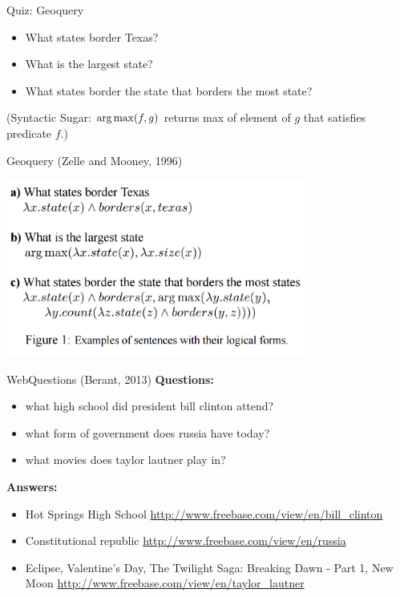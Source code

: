 \documentclass{beamer}
\begin{document}
\begin{frame}{Quiz: Geoquery}
  \begin{itemize}
  \item What states border Texas?
    \air 
  \item What is the largest state?
    \air 
  \item What states border the state that borders  the most state?
  \end{itemize}

  (Syntactic Sugar: $\argmax(f, g)$ returns max of element of $g$ that satisfies 
    predicate $f$.)
\end{frame}




\begin{frame}{Geoquery (Zelle and Mooney, 1996)}
  \begin{center}
    \includegraphics[width=10cm]{geoquery}
  \end{center}
\end{frame}

\begin{frame}[fragile]{WebQuestions (Berant, 2013)} 
\textbf{Questions:}
\begin{itemize}
\item what high school did president bill clinton attend?
\item what form of government does russia have today?
\item what movies does taylor lautner play in?
\end{itemize}
\textbf{Answers:}
\begin{itemize}
\item Hot Springs High School \url{http://www.freebase.com/view/en/bill_clinton}
\item Constitutional republic \url{http://www.freebase.com/view/en/russia}
\item  Eclipse, Valentine's Day, The Twilight Saga: Breaking Dawn -   Part 1, New Moon \url{http://www.freebase.com/view/en/taylor_lautner}
\end{itemize}


\end{frame}
\end{document}
